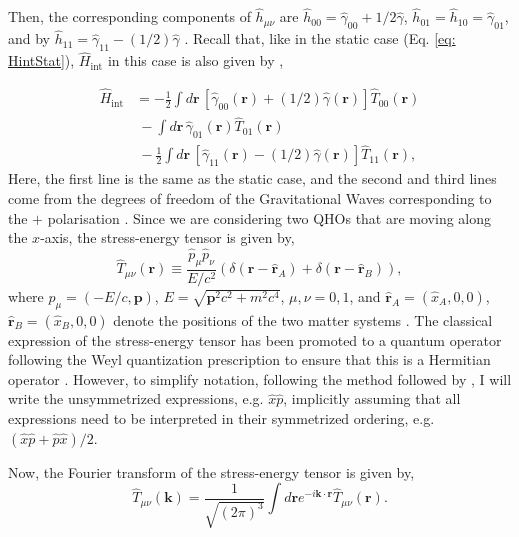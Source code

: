 \documentclass[12pt,a4paper]{report}
\theoremstyle{plain}
\theoremstyle{definition}
\theoremstyle{remark}
\newcommand{\munu}{\mu\nu}
\newcommand{\Hint}{\hat{H}_{\text{int}}}
\begin{document}
Then, the corresponding components of $\hat{h}_{\munu}$ are $\hat{h}_{00} = \hat{\gamma}_{00} + 1/2\hat{\gamma}$, $\hat{h}_{01}=\hat{h}_{10}=\hat{\gamma}_{01}$,
and by $\hat{h}_{11}=\hat{\gamma}_{11}-(1/2)\hat{\gamma}$ \cite{Bose_2022}. Recall that, like in the static case (Eq. \ref{eq: HintStat}), $\Hint$ in this case is also given by \cite{Bose_2022},

\begin{equation} \label{eq:HintNonStat}
    \begin{aligned}
        \hat{H}_{\text{int}} &= - \frac{1}{2}\int d{\bm{r}}\,\left[\hat{\gamma}_{00}({\bm{r}})+(1/2)\hat{\gamma}({\bm{r}})\right]\hat{T}_{00}({\bm{r}}) \\
 &\ -\int d{\bm{r}}\,\hat{\gamma}_{01}({\bm{r}})\hat{T}_{01}({\bm{r}}) \\
 &\ -\frac{1}{2}\int d{\bm{r}}\,\left[\hat{\gamma}_{11}({\bm{r}})-(1/2)\hat{\gamma}({\bm{r}})\right]\hat{T}_{11}({\bm{r}}),
    \end{aligned}    
\end{equation}
Here, the first line is the same as the static case, and the second and third lines come from the degrees of freedom of the Gravitational Waves corresponding to the $+$ polarisation \cite{Bose_2022, weinberg}. Since we are considering two QHOs that are moving along the $x$-axis, the stress-energy tensor is given by,
\begin{equation}
    \hat{T}_{\mu\nu}(\bm{r})\equiv\frac{\hat{p}_{\mu}\hat{p}_{\nu}}{E/c^{2}}(\delta(\bm{r}-\hat{\bm{r}}_{A})+\delta(\bm{r}-\hat{\bm{r}}_{B})),
\end{equation}
where $p_{\mu}=(-E/c,\bm{p})$, $E=\sqrt{\bm{p}^{2}c^{2}+m^{2}c^{4}}$,
$\mu,\nu=0,1$, and $\hat{\bm{r}}_{A}=(\hat{x}_{A},0,0)$,~$\hat{\bm{r}}_{B}=(\hat{x}_{B},0,0)$ denote the positions of the two matter systems \cite{Bose_2022}. The classical expression of the stress-energy tensor has been promoted to a quantum operator following the Weyl quantization prescription to ensure that this is a Hermitian operator \cite{Bose_2022}. However, to simplify notation, following the method followed by \citet{Bose_2022}, I will write the unsymmetrized expressions, e.g. $\hat{x}\hat{p}$, implicitly assuming that all expressions need to be interpreted in their symmetrized ordering, e.g.$(\hat{x}\hat{p} + \hat{p}\hat{x})/2$.

Now, the Fourier transform of the stress-energy tensor is given by,
\begin{equation}
\hat{T}_{\mu\nu}(\bm{k})=\frac{1}{\sqrt{(2\pi)^{3}}}\int d\bm{r}e^{-i\bm{k}\cdot\bm{r}}\hat{T}_{\mu\nu}(\bm{r}).
\end{equation}
\end{document}

